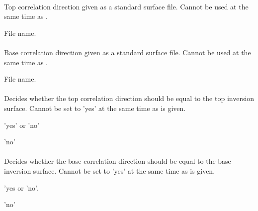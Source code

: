 \paragraph{}
 \slist
   \item \Description Top correlation direction given as a standard surface file. Cannot be used at the same time as .
   \item \Argument File name.
   \item \Default
 \elist

\paragraph{}
 \slist
   \item \Description Base correlation direction given as a standard surface file. Cannot be used at the same time as .
   \item \Argument File name.
   \item \Default
 \elist

\paragraph{}
 \slist
   \item \Description Decides whether the top correlation direction should be equal to the top inversion surface. Cannot be set to 'yes' at the same time as  is given.
   \item \Argument 'yes' or 'no'
   \item \Default 'no'
 \elist

\paragraph{}
 \slist
   \item \Description Decides whether the base correlation direction should be equal to the base inversion surface. Cannot be set to 'yes' at the same time as  is given.
   \item \Argument 'yes or 'no'.
   \item \Default 'no'
 \elist

